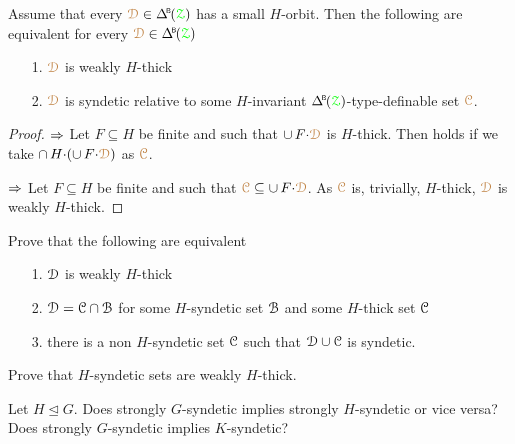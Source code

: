 \begin{proposition}
  Assume that every $\mrD\in\BDelta(\grZ)$ has a small $H$-orbit.
  Then the following are equivalent for every $\mrD\in\BDelta(\grZ)$
  \begin{itemize}
    \item [1.] ${\color{brown}\EuScript D}$ is weakly $H$-thick
    \item [2.]${\color{brown}\EuScript D}$ is syndetic relative to some $H$-invariant $\BDelta(\grZ)$-type-definable set ${\color{brown}\EuScript C}$.
  \end{itemize}
\end{proposition}

\begin{proof}
  $\Rightarrow$ Let $F\subseteq H$ be finite and such that $\cup\,F{\cdot}{\color{brown}\EuScript D}$ is $H$-thick.
  Then  holds if we take $\cap\,H{\cdot}(\cup\,F{\cdot}{\color{brown}\EuScript D})$ as ${\color{brown}\EuScript C}$.

  $\Rightarrow$ Let $F\subseteq H$ be finite and such that ${\color{brown}\EuScript C}\subseteq\cup\,F{\cdot}{\color{brown}\EuScript D}$.
  As ${\color{brown}\EuScript C}$ is, trivially, $H$-thick, ${\color{brown}\EuScript D}$ is weakly $H$-thick.
\end{proof}


\begin{exercise}
  Prove that the following are equivalent
  \begin{itemize}
    \item[1.] $\EuScript D$ is weakly $H$-thick
    \item[2.] $\EuScript D=\EuScript C\cap\EuScript B$ for some $H$-syndetic set $\EuScript B$ and some $H$-thick set $\EuScript C$
    \item [3.] there is a non $H$-syndetic set $\EuScript C$ such that $\EuScript D\cup\EuScript C$ is syndetic.
  \end{itemize}
\end{exercise}

\begin{exercise}
  Prove that $H$-syndetic sets are weakly $H$-thick.
\end{exercise}

\begin{question}
  Let $H\trianglelefteq G$.
  Does strongly $G$-syndetic implies strongly $H$-syndetic or vice versa?
  Does strongly $G$-syndetic implies $K$-syndetic?
\end{question}

